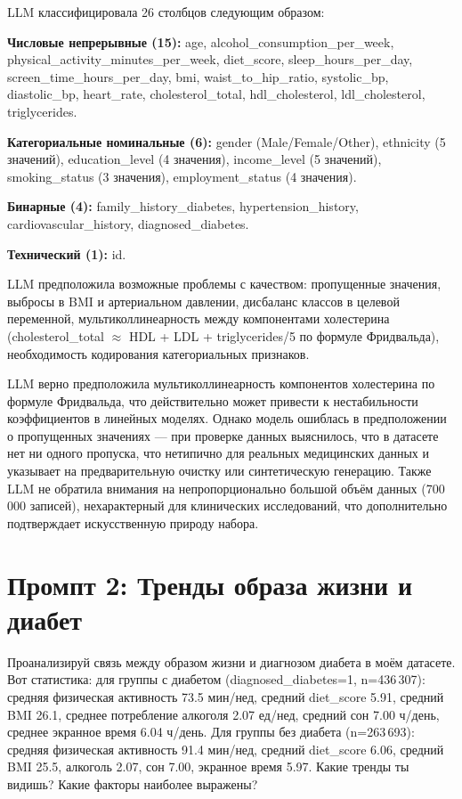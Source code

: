 \documentclass[12pt, a4paper]{article}
\begin{document}
\begin{responsebox}
LLM классифицировала 26 столбцов следующим образом:

\textbf{Числовые непрерывные (15):} age, alcohol\_consumption\_per\_week, physical\_activity\_minutes\_per\_week, diet\_score, sleep\_hours\_per\_day, screen\_time\_hours\_per\_day, bmi, waist\_to\_hip\_ratio, systolic\_bp, diastolic\_bp, heart\_rate, cholesterol\_total, hdl\_cholesterol, ldl\_cholesterol, triglycerides.

\textbf{Категориальные номинальные (6):} gender (Male/Female/Other), ethnicity (5 значений), education\_level (4 значения), income\_level (5 значений), smoking\_status (3 значения), employment\_status (4 значения).

\textbf{Бинарные (4):} family\_history\_diabetes, hypertension\_history, cardiovascular\_history, diagnosed\_diabetes.

\textbf{Технический (1):} id.

LLM предположила возможные проблемы с качеством: пропущенные значения, выбросы в BMI и артериальном давлении, дисбаланс классов в целевой переменной, мультиколлинеарность между компонентами холестерина (cholesterol\_total $\approx$ HDL + LDL + triglycerides/5 по формуле Фридвальда), необходимость кодирования категориальных признаков.
\end{responsebox}

\begin{commentbox}
LLM верно предположила мультиколлинеарность компонентов холестерина по формуле Фридвальда, что действительно может привести к нестабильности коэффициентов в линейных моделях. Однако модель ошиблась в предположении о пропущенных значениях --- при проверке данных выяснилось, что в датасете нет ни одного пропуска, что нетипично для реальных медицинских данных и указывает на предварительную очистку или синтетическую генерацию. Также LLM не обратила внимания на непропорционально большой объём данных (700\,000 записей), нехарактерный для клинических исследований, что дополнительно подтверждает искусственную природу набора.
\end{commentbox}

\section{Промпт 2: Тренды образа жизни и диабет}

\begin{promptbox}
Проанализируй связь между образом жизни и диагнозом диабета в моём датасете. Вот статистика: для группы с диабетом (diagnosed\_diabetes=1, n=436\,307): средняя физическая активность 73.5 мин/нед, средний diet\_score 5.91, средний BMI 26.1, среднее потребление алкоголя 2.07 ед/нед, средний сон 7.00 ч/день, среднее экранное время 6.04 ч/день. Для группы без диабета (n=263\,693): средняя физическая активность 91.4 мин/нед, средний diet\_score 6.06, средний BMI 25.5, алкоголь 2.07, сон 7.00, экранное время 5.97. Какие тренды ты видишь? Какие факторы наиболее выражены?
\end{promptbox}
\end{document}
